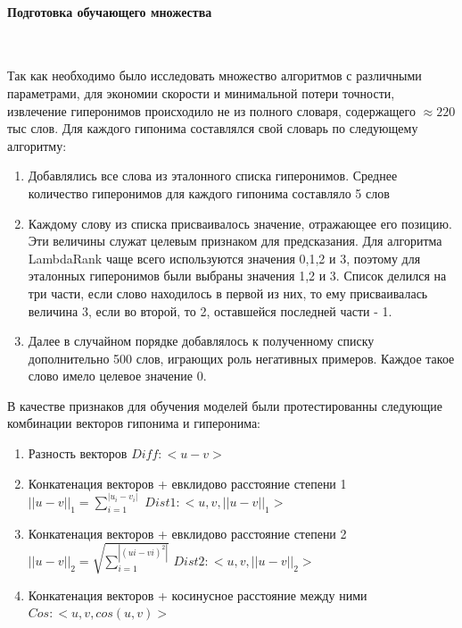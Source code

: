 \paragraph{Подготовка обучающего множества}
~\
~\

Так как необходимо было исследовать множество алгоритмов с различными параметрами,
для экономии скорости и минимальной потери точности, извлечение гиперонимов
происходило не из полного словаря, содержащего $\approx 220$ тыс слов. Для каждого гипонима
составлялся свой словарь по следующему алгоритму:

\begin{enumerate}
\item Добавлялись все слова из эталонного списка гиперонимов. Среднее количество
гиперонимов для каждого гипонима составляло 5 слов

\item Каждому слову из списка присваивалось значение, отражающее его позицию. Эти
величины служат целевым признаком для предсказания. Для алгоритма
LambdaRank чаще всего используются значения 0,1,2 и 3, поэтому для эталонных
гиперонимов были выбраны значения 1,2 и 3. Список делился на три части, если
слово находилось в первой из них, то ему присваивалась величина 3, если во
второй, то 2, оставшейся последней части - 1.

\item Далее в случайном порядке добавлялось к полученному списку дополнительно 500
слов, играющих роль негативных примеров. Каждое такое слово имело целевое
значение 0.
\end{enumerate}

В качестве признаков для обучения моделей были протестированны следующие
комбинации векторов гипонима и гиперонима:

\begin{enumerate}
\item Разность векторов
$Diff: <u - v>$

\item Конкатенация векторов + евклидово расстояние степени 1
$||u - v||_1 = \sum_{i=1}^{|u_i - v_i|}$
$Dist1: <u, v, ||u - v||_1>$

\item Конкатенация векторов + евклидово расстояние степени 2
$||u - v||_2 = \sqrt{\sum_{i=1}^{|(ui - vi)^2|}}$
$Dist2: <u, v, || u - v ||_2>$

\item Конкатенация векторов + косинусное расстояние между ними
$Cos: <u, v, cos(u, v)>$
\end{enumerate}

